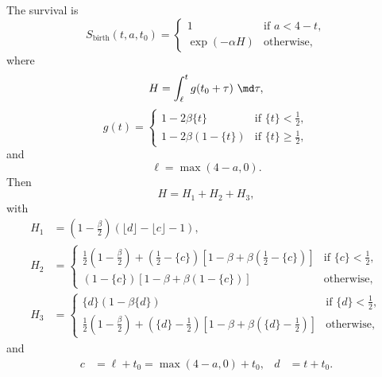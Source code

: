 \documentclass{jpmarticle}
\begin{document}
The survival is
\begin{equation}
  S_{\text{birth}}(t, a, t_0) =
  \begin{cases}
    1 & \text{if $a < 4 - t$},
    \\
    \exp(-\alpha H) & \text{otherwise},
  \end{cases}
\end{equation}
where
\begin{equation}
  H =
  \int_{\ell}^t g(t_0 + \tau)~\md \tau,
\end{equation}
\begin{equation}
  g (t) =
  \begin{cases}
    1 - 2 \beta \{t\}
    & \text{if $\{t\} < \frac{1}{2}$},
    \\
    1 - 2 \beta (1 - \{t\})
    & \text{if $\{t\} \geq \frac{1}{2}$},
  \end{cases}
\end{equation}
and
\begin{equation}
  \ell = \max(4 - a, 0).
\end{equation}
Then
\begin{equation}
  H = H_1  + H_2 + H_3,
\end{equation}
with
\begin{align}
  H_1 &= \left(1 - \frac{\beta}{2}\right)
  \left(\lfloor d \rfloor - \lfloor c \rfloor - 1\right),
  \\
  H_2 &=
  \begin{cases}
    \frac{1}{2} \left(1 - \frac{\beta}{2}\right)
    + \left(\frac{1}{2} - \{c\}\right)
    \left[1 - \beta
      + \beta \left(\frac{1}{2} - \{c\}\right)\right]
    & \text{if $\{c\} < \frac{1}{2}$},
    \\
    \left(1 - \{c\}\right)
    \left[1 - \beta + \beta \left(1 - \{c\}\right)\right]
    & \text{otherwise},
  \end{cases}
  \\
  H_3 &=
  \begin{cases}
    \{d\}\left(1 - \beta \{d\}\right)
    & \text{if $\{d\} < \frac{1}{2}$},
    \\
    \frac{1}{2} \left(1 - \frac{\beta}{2}\right)
    + \left(\{d\} - \frac{1}{2}\right)
    \left[1 - \beta
      + \beta \left(\{d\} - \frac{1}{2}\right)\right]
    & \text{otherwise},
    \end{cases}
\end{align}
and
\begin{align}
  c &= \ell + t_0 = \max(4 - a, 0) + t_0,
  &
  d &= t + t_0.
\end{align}
\end{document}
